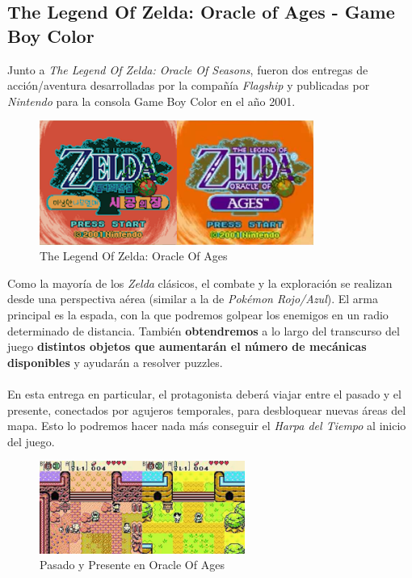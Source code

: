 \subsection{The Legend Of Zelda: Oracle of Ages - Game Boy Color}

Junto a \textit{The Legend Of Zelda: Oracle Of Seasons}, fueron dos entregas de acción/aventura desarrolladas por la compañía \textit{Flagship} y publicadas por \textit{Nintendo} para la consola Game Boy Color en el año 2001.

\begin{figure}[h]
\centering
\includegraphics[width=0.8\textwidth]{include/images/GameBoy/zelda_title.png}
\caption{The Legend Of Zelda: Oracle Of Ages}
\label{figure:zelda_title}
\end{figure}

Como la mayoría de los \textit{Zelda} clásicos, el combate y la exploración se realizan desde una perspectiva aérea (similar a la de \textit{Pokémon Rojo/Azul}). El arma principal es la espada, con la que podremos golpear los enemigos en un radio determinado de distancia. También \textbf{obtendremos} a lo largo del transcurso del juego \textbf{distintos objetos que aumentarán el número de mecánicas disponibles} y ayudarán a resolver puzzles.
\\ \\
En esta entrega en particular, el protagonista deberá viajar entre el pasado y el presente, conectados por agujeros temporales, para desbloquear nuevas áreas del mapa. Esto lo podremos hacer nada más conseguir el \textit{Harpa del Tiempo} al inicio del juego.

\begin{figure}[h]
\centering
\includegraphics[width=0.6\textwidth]{include/images/GameBoy/zelda_pp.jpg}
\caption{Pasado y Presente en Oracle Of Ages}
\label{figure:zelda_pp}
\end{figure}

